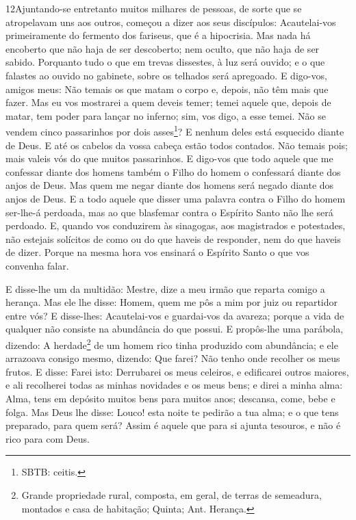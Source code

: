 \lettrine{12} Ajuntando-se entretanto muitos milhares de
pessoas, de sorte que se atropelavam uns aos outros, começou a dizer
aos seus discípulos: Acautelai-vos primeiramente do fermento dos
fariseus, que é a hipocrisia. Mas nada há encoberto que não haja
de ser descoberto; nem oculto, que não haja de ser sabido.
Porquanto tudo o que em trevas dissestes, à luz será ouvido; e o
que falastes ao ouvido no gabinete, sobre os telhados será
apregoado. E digo-vos, amigos meus: Não temais os que matam o
corpo e, depois, não têm mais que fazer. Mas eu vos mostrarei a
quem deveis temer; temei aquele que, depois de matar, tem poder para
lançar no inferno; sim, vos digo, a esse temei. Não se vendem
cinco passarinhos por dois asses\footnote{SBTB: ceitis.}? E nenhum
deles está esquecido diante de Deus. E até os cabelos da vossa
cabeça estão todos contados. Não temais pois; mais valeis vós do que
muitos passarinhos. E digo-vos que todo aquele que me confessar
diante dos homens também o Filho do homem o confessará diante dos
anjos de Deus. Mas quem me negar diante dos homens será negado
diante dos anjos de Deus. E a todo aquele que disser uma
palavra contra o Filho do homem ser-lhe-á perdoada, mas ao que
blasfemar contra o Espírito Santo não lhe será perdoado. E,
quando vos conduzirem às sinagogas, aos magistrados e potestades,
não estejais solícitos de como ou do que haveis de responder, nem do
que haveis de dizer. Porque na mesma hora vos ensinará o
Espírito Santo o que vos convenha falar.

E disse-lhe um da multidão: Mestre, dize a meu irmão que reparta
comigo a herança. Mas ele lhe disse: Homem, quem me pôs a mim
por juiz ou repartidor entre vós? E disse-lhes: Acautelai-vos
e guardai-vos da avareza; porque a vida de qualquer não consiste na
abundância do que possui. E propôs-lhe uma parábola, dizendo:
A herdade\footnote{Grande propriedade rural, composta, em geral, de
terras de semeadura, montados e casa de habitação; Quinta; Ant.
Herança.} de um homem rico tinha produzido com abundância; e
ele arrazoava consigo mesmo, dizendo: Que farei? Não tenho onde
recolher os meus frutos. E disse: Farei isto: Derrubarei os
meus celeiros, e edificarei outros maiores, e ali recolherei todas
as minhas novidades e os meus bens; e direi a minha alma:
Alma, tens em depósito muitos bens para muitos anos; descansa, come,
bebe e folga. Mas Deus lhe disse: Louco! esta noite te
pedirão a tua alma; e o que tens preparado, para quem será?
Assim é aquele que para si ajunta tesouros, e não é rico para
com Deus.

